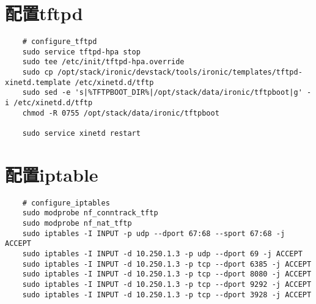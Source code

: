 \documentclass[a4paper,left=1.5cm,right=1.5cm,11pt]{article}
\begin{document}
\section{配置tftpd}
	\begin{lstlisting}
	# configure_tftpd
	sudo service tftpd-hpa stop
	sudo tee /etc/init/tftpd-hpa.override
	sudo cp /opt/stack/ironic/devstack/tools/ironic/templates/tftpd-xinetd.template /etc/xinetd.d/tftp
	sudo sed -e 's|%TFTPBOOT_DIR%|/opt/stack/data/ironic/tftpboot|g' -i /etc/xinetd.d/tftp
	chmod -R 0755 /opt/stack/data/ironic/tftpboot
	
	sudo service xinetd restart
	\end{lstlisting}

\section{配置iptable}
	\begin{lstlisting}
	# configure_iptables
	sudo modprobe nf_conntrack_tftp
	sudo modprobe nf_nat_tftp
	sudo iptables -I INPUT -p udp --dport 67:68 --sport 67:68 -j ACCEPT
	sudo iptables -I INPUT -d 10.250.1.3 -p udp --dport 69 -j ACCEPT
	sudo iptables -I INPUT -d 10.250.1.3 -p tcp --dport 6385 -j ACCEPT
	sudo iptables -I INPUT -d 10.250.1.3 -p tcp --dport 8080 -j ACCEPT
	sudo iptables -I INPUT -d 10.250.1.3 -p tcp --dport 9292 -j ACCEPT
	sudo iptables -I INPUT -d 10.250.1.3 -p tcp --dport 3928 -j ACCEPT
	\end{lstlisting}
\end{document}
